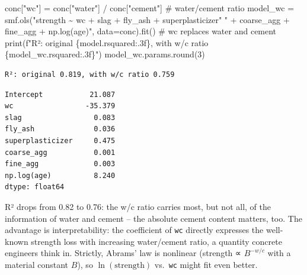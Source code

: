 \documentclass[
  letterpaper,
  DIV=11,
  numbers=noendperiod]{scrreprt}
\newenvironment{Shaded}{\begin{snugshade}}{\end{snugshade}}
\newcommand{\BuiltInTok}[1]{\textcolor[rgb]{0.00,0.23,0.31}{#1}}
\newcommand{\CommentTok}[1]{\textcolor[rgb]{0.37,0.37,0.37}{#1}}
\newcommand{\DecValTok}[1]{\textcolor[rgb]{0.68,0.00,0.00}{#1}}
\newcommand{\NormalTok}[1]{\textcolor[rgb]{0.00,0.23,0.31}{#1}}
\newcommand{\OperatorTok}[1]{\textcolor[rgb]{0.37,0.37,0.37}{#1}}
\newcommand{\SpecialCharTok}[1]{\textcolor[rgb]{0.37,0.37,0.37}{#1}}
\newcommand{\SpecialStringTok}[1]{\textcolor[rgb]{0.13,0.47,0.30}{#1}}
\newcommand{\StringTok}[1]{\textcolor[rgb]{0.13,0.47,0.30}{#1}}
\begin{document}
\begin{tcolorbox}[enhanced jigsaw, left=2mm, title=\textcolor{quarto-callout-caution-color}{\faFire}\hspace{0.5em}{Solution to Exercise 2}, opacityback=0, breakable, rightrule=.15mm, arc=.35mm, toptitle=1mm, colbacktitle=quarto-callout-caution-color!10!white, opacitybacktitle=0.6, coltitle=black, colframe=quarto-callout-caution-color-frame, bottomrule=.15mm, leftrule=.75mm, bottomtitle=1mm, titlerule=0mm, toprule=.15mm, colback=white]

\begin{Shaded}
\begin{Highlighting}[]
\NormalTok{conc[}\StringTok{"wc"}\NormalTok{] }\OperatorTok{=}\NormalTok{ conc[}\StringTok{"water"}\NormalTok{] }\OperatorTok{/}\NormalTok{ conc[}\StringTok{"cement"}\NormalTok{]                  }\CommentTok{\# water/cement ratio}
\NormalTok{model\_wc }\OperatorTok{=}\NormalTok{ smf.ols(}\StringTok{"strength \textasciitilde{} wc + slag + fly\_ash + superplasticizer"}
                   \StringTok{" + coarse\_agg + fine\_agg + np.log(age)"}\NormalTok{, data}\OperatorTok{=}\NormalTok{conc).fit()  }\CommentTok{\# wc replaces water and cement}
\BuiltInTok{print}\NormalTok{(}\SpecialStringTok{f"R²: original }\SpecialCharTok{\{}\NormalTok{model}\SpecialCharTok{.}\NormalTok{rsquared}\SpecialCharTok{:.3f\}}\SpecialStringTok{, with w/c ratio }\SpecialCharTok{\{}\NormalTok{model\_wc}\SpecialCharTok{.}\NormalTok{rsquared}\SpecialCharTok{:.3f\}}\SpecialStringTok{"}\NormalTok{)}
\NormalTok{model\_wc.params.}\BuiltInTok{round}\NormalTok{(}\DecValTok{3}\NormalTok{)}
\end{Highlighting}
\end{Shaded}

\begin{verbatim}
R²: original 0.819, with w/c ratio 0.759
\end{verbatim}

\begin{verbatim}
Intercept           21.087
wc                 -35.379
slag                 0.083
fly_ash              0.036
superplasticizer     0.475
coarse_agg           0.001
fine_agg             0.003
np.log(age)          8.240
dtype: float64
\end{verbatim}

R² drops from 0.82 to 0.76: the w/c ratio carries most, but not all, of
the information of water and cement -- the absolute cement content
matters, too. The advantage is interpretability: the coefficient of
\texttt{wc} directly expresses the well-known strength loss with
increasing water/cement ratio, a quantity concrete engineers think in.
Strictly, Abrams' law is nonlinear (strength ∝ \(B^{-w/c}\) with a
material constant \(B\)), so \(\ln(\text{strength})\) vs.~\texttt{wc}
might fit even better.

\end{tcolorbox}
\end{document}
